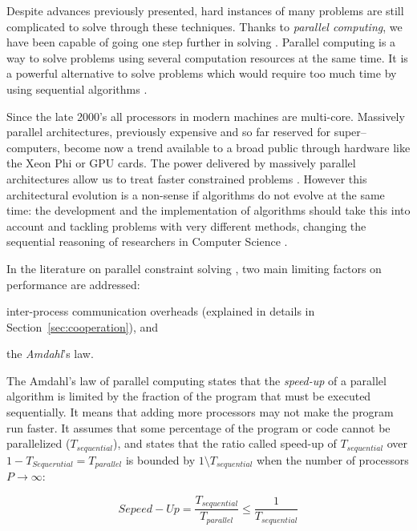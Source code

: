 Despite advances previously presented, hard instances of many problems are still complicated to solve through these techniques. Thanks to \textit{parallel computing}, we have been capable of going one step further in solving \csps. Parallel computing is a way to solve problems using several computation resources at the same time. It is a powerful alternative to solve problems which would require too much time by using sequential algorithms \cite{Grama2003}. %

Since the late 2000's all processors in modern machines are multi-core. Massively parallel architectures, previously expensive and so far reserved for super--computers, become now a trend available to a broad public through hardware like the Xeon Phi or GPU cards. The power delivered by massively parallel architectures allow us to treat faster constrained problems \cite{Borkar2007}. However this architectural evolution is a non-sense if algorithms do not evolve at the same time: the development and the implementation of algorithms should take this into account and tackling problems with very different methods, changing the sequential reasoning of researchers in Computer Science \cite{Hill2008, Sanders2014}. 

In the literature on parallel constraint solving \cite{Gent}, two main limiting factors on performance are addressed: \begin{inparaenum}[1-] \item inter-process communication overheads (explained in details in Section~\ref{sec:cooperation}), and \item the \textit{Amdahl}'s law. \end{inparaenum} The Amdahl's law of parallel computing states that the \textit{speed-up} of a parallel algorithm is limited by the fraction of the program that must be executed sequentially. It means that adding more processors may not make the program run faster. It assumes that some percentage of the program or code cannot be parallelized ($T_{sequential}$), and states that the ratio called speed-up of $T_{sequential}$ over $1 - T_{Sequerntial} = T_{parallel}$ is bounded by $1\setminus T_{sequential}$ when the number of processors $P \rightarrow \infty$:

\begin{equation}\label{amdahl}
Sepeed-Up = \frac{T_{sequential}}{T_{parallel}} \leq \frac{1}{T_{sequential}}
\end{equation}

